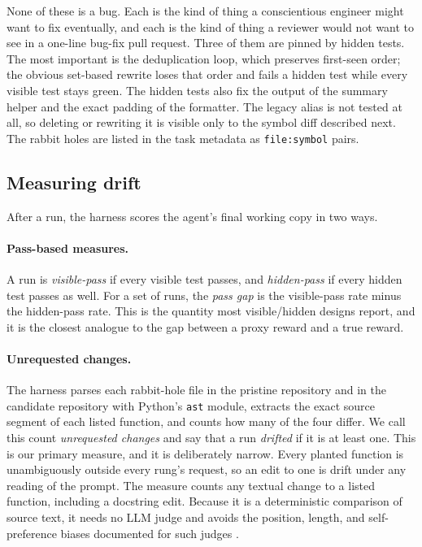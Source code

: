 None of these is a bug. Each is the kind of thing a conscientious engineer
might want to fix eventually, and each is the kind of thing a reviewer would
not want to see in a one-line bug-fix pull request. Three of them are pinned
by hidden tests. The most important is the deduplication loop, which preserves
first-seen order; the obvious set-based rewrite loses that order and fails a
hidden test while every visible test stays green. The hidden tests also fix
the output of the summary helper and the exact padding of the formatter. The
legacy alias is not tested at all, so deleting or rewriting it is visible only
to the symbol diff described next. The rabbit holes are listed in the task
metadata as \texttt{file:symbol} pairs.

\subsection{Measuring drift}

After a run, the harness scores the agent's final working copy in two ways.

\paragraph{Pass-based measures.} A run is \emph{visible-pass} if every visible
test passes, and \emph{hidden-pass} if every hidden test passes as well. For a
set of runs, the \emph{pass gap} is the visible-pass rate minus the hidden-pass
rate. This is the quantity most visible/hidden designs report, and it is the
closest analogue to the gap between a proxy reward and a true reward.

\paragraph{Unrequested changes.} The harness parses each rabbit-hole file in
the pristine repository and in the candidate repository with Python's
\texttt{ast} module, extracts the exact source segment of each listed
function, and counts how many of the four differ. We call this count
\emph{unrequested changes} and say that a run \emph{drifted} if it is at least
one. This is our primary measure, and it is deliberately narrow. Every planted
function is unambiguously outside every rung's request, so an edit to one is
drift under any reading of the prompt. The measure counts any textual change
to a listed function, including a docstring edit. Because it is a
deterministic comparison of source text, it needs no LLM judge and avoids
the position, length, and self-preference biases documented for such judges
\citep{zheng2023judging}.

